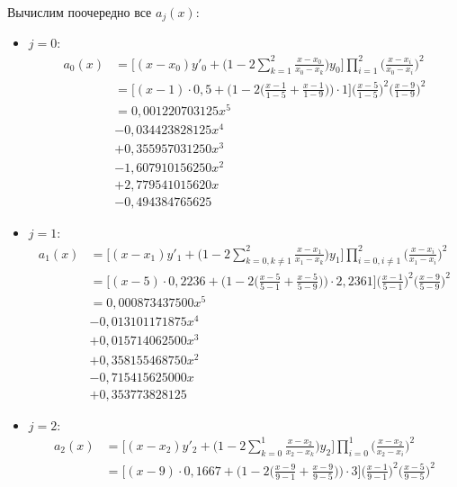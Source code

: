 \documentclass[a4paper, 12pt]{article}
\begin{document}
	Вычислим поочередно все $a_j(x)$:
	\begin{itemize}
		\item $j=0$:
		\begin{equation*}
			\begin{aligned}
				a_0(x)&=\bigg[(x-x_0)y'_0+\bigg(1-2\sum\limits_{k=1}^2\frac{x-x_0}{x_0-x_k}\bigg)y_0\bigg]\prod\limits_{i=1}^2\bigg(\frac{x-x_i}{x_0-x_i}\bigg)^2\\&=\bigg[(x-1)\cdot0,5+\bigg(1-2\bigg(\frac{x-1}{1-5}+\frac{x-1}{1-9}\bigg)\bigg)\cdot1\bigg]\bigg(\frac{x-5}{1-5}\bigg)^2\bigg(\frac{x-9}{1-9}\bigg)^2\\
				&=0,001220703125x^5\\
				&-0,034423828125x^4\\
				&+0,355957031250x^3\\
				&-1,607910156250x^2\\ 
				&+2,779541015620x\\
				&-0,494384765625
			\end{aligned}
		\end{equation*}
		\item $j=1$:
		\begin{equation*}
			\begin{aligned}
				a_1(x)&=\bigg[(x-x_1)y'_1+\bigg(1-2\sum\limits_{k=0,k\neq 1}^2\frac{x-x_1}{x_1-x_k}\bigg)y_1\bigg]\prod\limits_{i=0,i\neq 1}^2\bigg(\frac{x-x_i}{x_1-x_i}\bigg)^2\\&=\bigg[(x-5)\cdot0,2236+\bigg(1-2\bigg(\frac{x-5}{5-1}+\frac{x-5}{5-9}\bigg)\bigg)\cdot2,2361\bigg]\bigg(\frac{x-1}{5-1}\bigg)^2\bigg(\frac{x-9}{5-9}\bigg)^2\\
				&=0,000873437500x^5\\
				&-0,013101171875x^4\\
				&+0,015714062500x^3\\
				&+0,358155468750x^2\\ 
				&-0,715415625000x\\
				&+0,353773828125
			\end{aligned}
		\end{equation*}
		\item $j=2$:
		\begin{equation*}
			\begin{aligned}
				a_2(x)&=\bigg[(x-x_2)y'_2+\bigg(1-2\sum\limits_{k=0}^1\frac{x-x_2}{x_2-x_k}\bigg)y_2\bigg]\prod\limits_{i=0}^1\bigg(\frac{x-x_2}{x_2-x_i}\bigg)^2\\&=\bigg[(x-9)\cdot0,1667+\bigg(1-2\bigg(\frac{x-9}{9-1}+\frac{x-9}{9-5}\bigg)\bigg)\cdot3\bigg]\bigg(\frac{x-1}{9-1}\bigg)^2\bigg(\frac{x-5}{9-5}\bigg)^2\\

\end{aligned}
\end{equation*}
\end{itemize}
\end{document}
